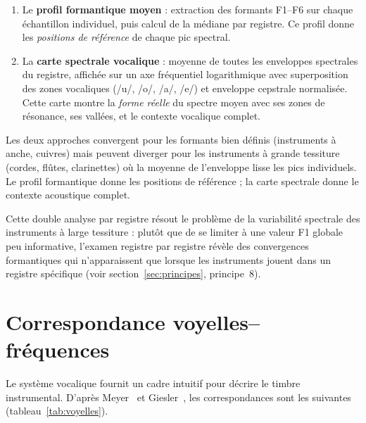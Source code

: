 \documentclass[11pt,a4paper]{article}
\begin{document}
\begin{enumerate}
  \item Le \textbf{profil formantique moyen} : extraction des formants
    F1--F6 sur chaque échantillon individuel, puis calcul de la médiane
    par registre. Ce profil donne les \emph{positions de référence} de
    chaque pic spectral.
  \item La \textbf{carte spectrale vocalique} : moyenne de toutes les
    enveloppes spectrales du registre, affichée sur un axe fréquentiel
    logarithmique avec superposition des zones vocaliques (/u/, /o/,
    /a/, /e/) et enveloppe cepstrale normalisée. Cette carte montre la
    \emph{forme réelle} du spectre moyen avec ses zones de résonance,
    ses vallées, et le contexte vocalique complet.
\end{enumerate}

Les deux approches convergent pour les formants bien définis (instruments
à anche, cuivres) mais peuvent diverger pour les instruments à grande
tessiture (cordes, flûtes, clarinettes) où la moyenne de l'enveloppe
lisse les pics individuels. Le profil formantique donne les positions de
référence ; la carte spectrale donne le contexte acoustique complet.

Cette double analyse par registre résout le problème de la variabilité
spectrale des instruments à large tessiture : plutôt que de se limiter à
une valeur F1 globale peu informative, l'examen registre par registre
révèle des convergences formantiques qui n'apparaissent que lorsque les
instruments jouent dans un registre spécifique (voir
section~\ref{sec:principes}, principe~8).


\section{Correspondance voyelles--fréquences}

Le système vocalique fournit un cadre intuitif pour décrire le timbre
instrumental. D'après Meyer~\cite{meyer2009} et
Giesler~\cite{giesler1985}, les correspondances sont les suivantes
(tableau~\ref{tab:voyelles}).
\end{document}
